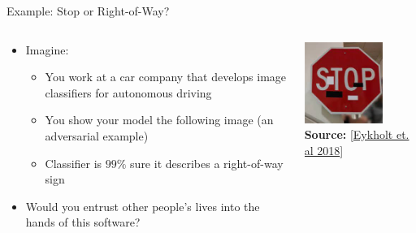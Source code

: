 \documentclass[10pt,compress,t,notes=noshow, xcolor=table]{beamer}
\begin{document}
\begin{frame}[t]{Example: Stop or Right-of-Way?}

\begin{columns}[c, totalwidth=\textwidth]

	\begin{column}{0.58\textwidth}
	\begin{itemize}
	    \item Imagine: 
	        \begin{itemize}
	            \item<1-> You work at a car company that develops image classifiers for autonomous driving
	            \item<1-> You show your model the following image (an adversarial example)
	            \item<2-> Classifier is $99\%$ sure it describes a right-of-way sign
	        \end{itemize}  
	    \item<2-> Would you entrust other people's lives into the hands of this software?
	\end{itemize}
	
	 \end{column}
	
	\begin{column}{0.45\textwidth}

	\begin{center}
		\includegraphics[width=0.7\textwidth]{figure/IntroStop.jpg}\\
		{\textbf{Source:} [\href{https://arxiv.org/abs/1707.08945}{Eykholt et. al 2018}]}
	\end{center}

     \end{column}

\end{columns}

\end{frame}
\end{document}
